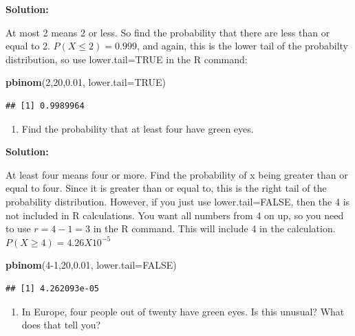 \documentclass[
]{book}
\newenvironment{Shaded}{\begin{snugshade}}{\end{snugshade}}
\newcommand{\DataTypeTok}[1]{\textcolor[rgb]{0.13,0.29,0.53}{#1}}
\newcommand{\DecValTok}[1]{\textcolor[rgb]{0.00,0.00,0.81}{#1}}
\newcommand{\FloatTok}[1]{\textcolor[rgb]{0.00,0.00,0.81}{#1}}
\newcommand{\KeywordTok}[1]{\textcolor[rgb]{0.13,0.29,0.53}{\textbf{#1}}}
\newcommand{\NormalTok}[1]{#1}
\newcommand{\OtherTok}[1]{\textcolor[rgb]{0.56,0.35,0.01}{#1}}
\providecommand{\tightlist}{%
  \setlength{\itemsep}{0pt}\setlength{\parskip}{0pt}}
\begin{document}
\textbf{Solution:}

At most 2 means 2 or less. So find the probability that there are less than or equal to 2. \(P(X \le 2)=0.999\), and again, this is the lower tail of the probabilty distribution, so use lower.tail=TRUE in the R command:

\begin{Shaded}
\begin{Highlighting}[]
\KeywordTok{pbinom}\NormalTok{(}\DecValTok{2}\NormalTok{,}\DecValTok{20}\NormalTok{,}\FloatTok{0.01}\NormalTok{, }\DataTypeTok{lower.tail=}\OtherTok{TRUE}\NormalTok{)}
\end{Highlighting}
\end{Shaded}

\begin{verbatim}
## [1] 0.9989964
\end{verbatim}

\begin{enumerate}
\def\labelenumi{\alph{enumi}.}
\setcounter{enumi}{6}
\tightlist
\item
  Find the probability that at least four have green eyes.
\end{enumerate}

\textbf{Solution:}

At least four means four or more. Find the probability of x being greater than or equal to four. Since it is greater than or equal to, this is the right tail of the probability distribution. However, if you just use lower.tail=FALSE, then the 4 is not included in R calculations. You want all numbers from 4 on up, so you need to use \(r=4-1=3\) in the R command. This will include 4 in the calculation. \(P(X \ge 4)=4.26X10^{-5}\)

\begin{Shaded}
\begin{Highlighting}[]
\KeywordTok{pbinom}\NormalTok{(}\DecValTok{4-1}\NormalTok{,}\DecValTok{20}\NormalTok{,}\FloatTok{0.01}\NormalTok{, }\DataTypeTok{lower.tail=}\OtherTok{FALSE}\NormalTok{)}
\end{Highlighting}
\end{Shaded}

\begin{verbatim}
## [1] 4.262093e-05
\end{verbatim}

\begin{enumerate}
\def\labelenumi{\alph{enumi}.}
\setcounter{enumi}{7}
\tightlist
\item
  In Europe, four people out of twenty have green eyes. Is this unusual? What does that tell you?
\end{enumerate}
\end{document}
